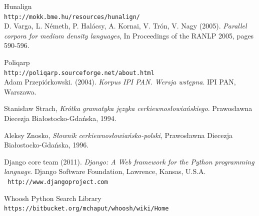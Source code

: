 \documentclass{pracamgr}
\begin{document}
\begin{thebibliography}{99}
 Hunalign\\
  {\tt http://mokk.bme.hu/resources/hunalign/}\\
  D. Varga, L. Németh, P. Halácsy, A. Kornai, V. Trón, V. Nagy (2005).
  \textit{Parallel corpora for medium density languages},
  In Proceedings of the RANLP 2005, pages 590-596.

 Poliqarp\\
  {\tt http://poliqarp.sourceforge.net/about.html}\\
  Adam Przepiórkowski. (2004). \textit{Korpus IPI PAN. Wersja
  wstępna}. IPI PAN, Warszawa.

 Stanisław Strach, \textit{Krótka gramatyka języka
  cerkiewno\-{}słowiańskiego}. Prawosławna Diecezja Białostocko-Gdańska,
  1994.

 Aleksy Znosko, \textit{Słownik
  cerkiewno\-{}słowiańsko-polski}, Prawosławna Diecezja
  Białostocko-Gdańska, 1996.

 Django core team (2011). \textit{Django: A Web
  framework for the Python programming language}. Django Software
  Foundation, Lawrence, Kansas, U.S.A. \\{\tt
    http://www.djangoproject.com}

 Whoosh Python Search Library\\
  {\tt https://bitbucket.org/mchaput/whoosh/wiki/Home}

\end{thebibliography}
\end{document}
